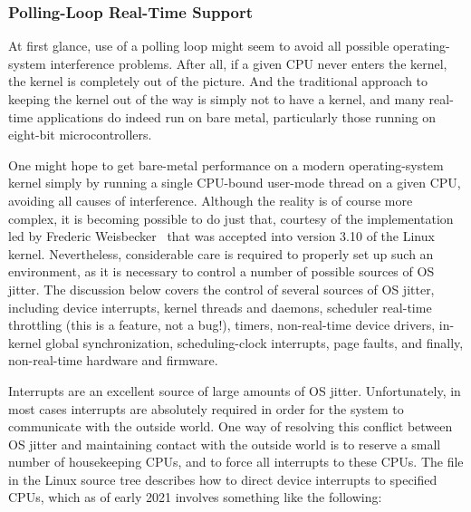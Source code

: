 \subsubsection{Polling-Loop Real-Time Support}
\label{sec:advsync:Polling-Loop Real-Time Support}

At first glance, use of a polling loop might seem to avoid all possible
operating-system interference problems.
After all, if a given CPU never enters the kernel, the kernel is
completely out of the picture.
And the traditional approach to keeping the kernel out of the way is
simply not to have a kernel, and many real-time applications do
indeed run on bare metal, particularly those running on eight-bit
microcontrollers.

One might hope to get bare-metal performance on a modern operating-system
kernel simply by running a single CPU-bound user-mode thread on a
given CPU, avoiding all causes of interference.
Although the reality is of course more complex, it is becoming
possible to do just that,
courtesy of the  implementation led by
Frederic Weisbecker~\cite{JonCorbet2013NO-HZ-FULL,FredericWeisbecker2013nohz}
that was accepted into version 3.10 of the Linux kernel.
Nevertheless, considerable care is required to properly set up such
an environment, as it is necessary to control a number of possible
sources of OS jitter.
The discussion below covers the control of several sources of OS
jitter, including device interrupts, kernel threads and daemons,
scheduler real-time throttling (this is a feature, not a bug!),
timers, non-real-time device drivers, in-kernel global synchronization,
scheduling-clock interrupts, page faults, and finally, non-real-time
hardware and firmware.

Interrupts are an excellent source of large amounts of OS jitter.
Unfortunately, in most cases interrupts are absolutely required in order
for the system to communicate with the outside world.
One way of resolving this conflict between OS jitter and maintaining
contact with the outside world is to reserve a small number of
housekeeping CPUs, and to force all interrupts to these CPUs.
The  file in the Linux source tree
describes how to direct device interrupts to specified CPUs,
which as of early 2021 involves something like the following:


